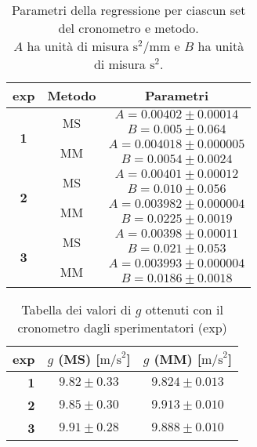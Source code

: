 \begin{table}[h]
\centering
\begin{tabular}{c|c|c}
    \textbf{exp} & \textbf{Metodo} & \textbf{Parametri} \\
    \hline
    \multirow{4}{*}{\textbf{1}} & \multirow{2}{*}{MS} & \( A = 0.00402 \pm 0.00014 \) \\
                            &    & \( B = 0.005 \pm 0.064 \) \\
    \cline{2-3}
                            & \multirow{2}{*}{MM}& \( A = 0.004018 \pm 0.000005 \) \\
                            &    & \( B = 0.0054 \pm 0.0024 \) \\
    \hline
    \multirow{4}{*}{\textbf{2}} & \multirow{2}{*}{MS} & \( A = 0.00401 \pm 0.00012 \) \\
                             &    & \( B = 0.010 \pm 0.056 \) \\
    \cline{2-3}
                             & \multirow{2}{*}{MM} & \( A = 0.003982 \pm 0.000004 \) \\
                             &    & \( B = 0.0225 \pm 0.0019 \) \\
    \hline
    \multirow{4}{*}{\textbf{3}} & \multirow{2}{*}{MS} & \( A = 0.00398 \pm 0.00011 \) \\
                             &    & \( B = 0.021 \pm 0.053 \) \\
    \cline{2-3}
                             & \multirow{2}{*}{MM} & \( A = 0.003993 \pm 0.000004 \) \\
                             &    & \( B = 0.0186 \pm 0.0018 \) \\
\end{tabular}
\caption{Parametri della regressione per ciascun set del cronometro e metodo.\\
$A$ ha unità di misura $\text{s}^2/\text{mm}$ e $B$ ha unità di misura $\text{s}^2$.}
\label{tab:valori regressione}
\end{table}

\begin{table}[h]
    \centering
    \begin{tabular}{r|c|c}
        \textbf{exp} & $g$ \textbf{(MS)} [$\text{m/s}^2$]& $g$ \textbf{(MM) [$\text{m/s}^2$]}\\
        \hline
        \textbf{1} & $9.82\pm0.33 $ & $9.824\pm0.013$ \\
        \textbf{2} & $9.85\pm0.30 $ & $9.913\pm0.010$ \\
        \textbf{3} & $9.91\pm0.28 $ & $9.888\pm0.010$ \\
    \end{tabular}
    \caption{Tabella dei valori di $g$ ottenuti con il cronometro dagli sperimentatori (exp)}
    \label{tab:valori g cronometro}
\end{table}


